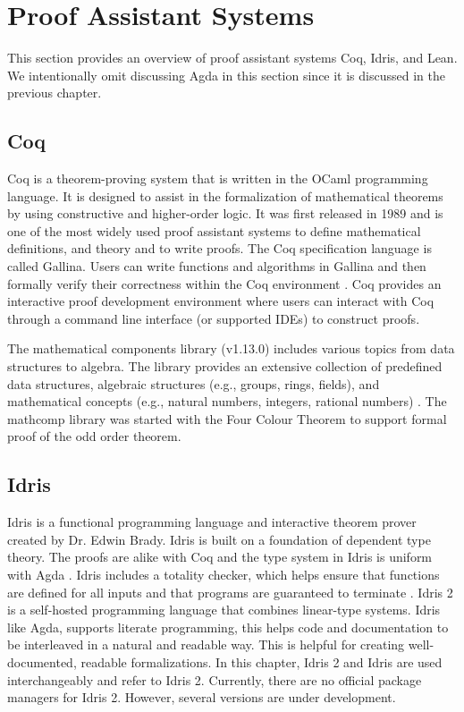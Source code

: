\section{Proof Assistant Systems}
\label{Proof_system}
This section provides an overview of proof assistant systems Coq, Idris, and
Lean. We intentionally omit discussing Agda in this section since it is
discussed in the previous chapter. 

\subsection{Coq}
Coq \cite{Paulin-Mohring2012} is a theorem-proving system that is written in the
OCaml programming language. It is designed to assist in the formalization of
mathematical theorems by using constructive and higher-order logic.  It was
first released in 1989 and is one of the most widely used proof assistant
systems to define mathematical definitions, and theory and to write proofs. The
Coq specification language is called Gallina. Users can write functions and
algorithms in Gallina and then formally verify their correctness within the Coq
environment \cite{bertot2013interactive}. Coq provides an interactive proof
development environment where users can interact with Coq through a command line
interface (or supported IDEs) to construct proofs.

The mathematical components library (v1.13.0) \cite{assia_mahboubi_2021_4457887}
includes various topics from data structures to algebra. The library provides an
extensive collection of predefined data structures, algebraic structures (e.g.,
groups, rings, fields), and mathematical concepts (e.g., natural numbers,
integers, rational numbers) \cite{2019arXiv191203028S}. The mathcomp library was
started with the Four Colour Theorem to support formal proof of the odd order
theorem. 

\subsection{Idris}
Idris is a functional programming language and interactive theorem prover
created by Dr. Edwin Brady. Idris is built on a foundation of dependent type
theory. The proofs are alike with Coq and the type system in Idris is uniform
with Agda \cite{brady2022idris}. Idris includes a totality checker, which helps
ensure that functions are defined for all inputs and that programs are
guaranteed to terminate \cite{brady2013idris}. Idris 2 is a self-hosted
programming language that combines linear-type systems. Idris like Agda, supports
literate programming, this helps code and documentation to be interleaved in a
natural and readable way. This is helpful for creating well-documented, readable
formalizations. In this chapter, Idris 2 and Idris are used interchangeably and
refer to Idris 2. Currently, there are no official package managers for Idris
2. However, several versions are under development. 

